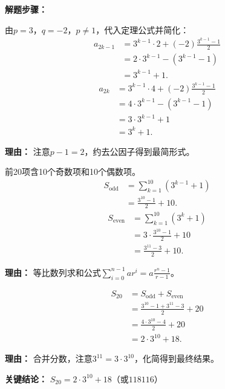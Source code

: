 \begin{examplebox}
	\textbf{\textcolor{CExample}{解题步骤：}}
	\begin{description}[style=nextline, leftmargin=2.8em, labelsep=0.5em, itemsep=0.45em]
		\item[\textbf{第一步（化简通项）：}] 由$p=3$，$q=-2$，$p\neq1$，代入定理公式并简化：
			\[
				\begin{aligned}
					a_{2k-1} &= 3^{k-1}\cdot2+(-2)\frac{3^{k-1}-1}{2} \\
					&= 2\cdot3^{k-1}-(3^{k-1}-1) \\
					&= 3^{k-1}+1.
			\end{aligned}
			\]
			\[
				\begin{aligned}
					a_{2k} &= 3^{k-1}\cdot4+(-2)\frac{3^{k-1}-1}{2} \\
					&= 4\cdot3^{k-1}-(3^{k-1}-1) \\
					&= 3\cdot3^{k-1}+1 \\
					&= 3^{k}+1.
			\end{aligned}
			\]
			\par\textbf{理由：} 注意$p-1=2$，约去公因子得到最简形式。
		\item[\textbf{第二步（分组求和）：}] 前20项含10个奇数项和10个偶数项。
			\[
				\begin{aligned}
					S_{\text{odd}} &= \sum_{k=1}^{10}(3^{k-1}+1) \\
					&= \frac{3^{10}-1}{2}+10.
			\end{aligned}
			\]
			\[
				\begin{aligned}
					S_{\text{even}} &= \sum_{k=1}^{10}(3^{k}+1) \\
					&= 3\cdot\frac{3^{10}-1}{2}+10 \\
					&= \frac{3^{11}-3}{2}+10.
			\end{aligned}
			\]
			\par\textbf{理由：} 等比数列求和公式$\sum_{i=0}^{n-1}ar^{i}=a\frac{r^{n}-1}{r-1}$。
		\item[\textbf{第三步（合并结果）：}]
			\[
				\begin{aligned}
					S_{20} &= S_{\text{odd}}+S_{\text{even}} \\
					&= \frac{3^{10}-1+3^{11}-3}{2}+20 \\
					&= \frac{4\cdot3^{10}-4}{2}+20 \\
					&= 2\cdot3^{10}+18.
			\end{aligned}
			\]
			\par\textbf{理由：} 合并分数，注意$3^{11}=3\cdot3^{10}$，化简得到最终结果。
	\end{description}

	\textbf{\textcolor{CExample}{关键结论：}}
	\textbf{$S_{20}=2\cdot3^{10}+18$}（或\textbf{$118116$}）
\end{examplebox}
